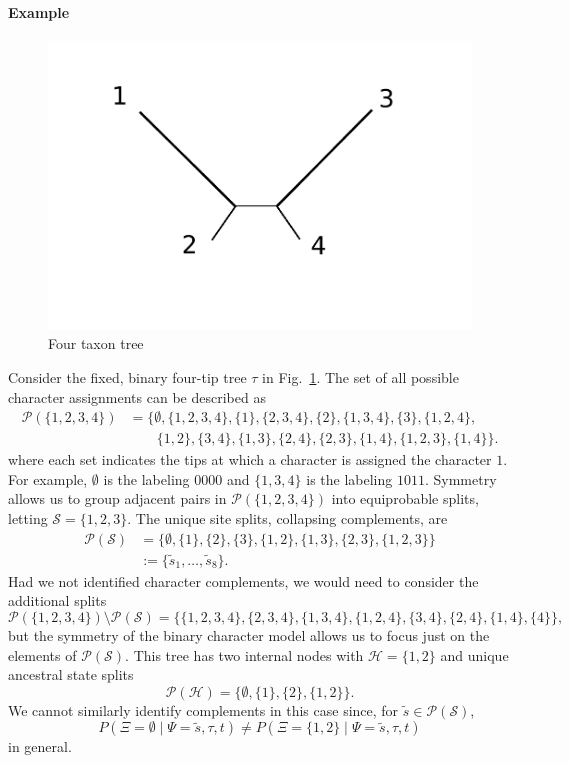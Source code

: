 \documentclass[a4paper]{article}
\newcommand{\siteSplit}{\tilde{s}}
\newcommand{\siteSplitSet}{\mathcal{S}}
\newcommand{\ancestralSplitSet}{\mathcal{H}}
\newcommand{\siteSplitRV}{\Psi}
\newcommand{\ancestralSplitRV}{\Xi}
\begin{document}
\paragraph{Example}
\begin{figure}
    \centering
    \includegraphics[width=.45\textwidth]{unrooted_four_taxa}
    \caption{Four taxon tree}
\label{fig:four-taxa-tree}
\end{figure}

Consider the fixed, binary four-tip tree $\tau$ in Fig.~\ref{fig:four-taxa-tree}.
The set of all possible character assignments can be described as
\begin{align*}
\mathcal{P}(\{1,2,3,4\}) &= \{\emptyset, \{1,2,3,4\}, \{1\}, \{2,3,4\}, \{2\}, \{1,3,4\}, \{3\}, \{1,2,4\}, \\
                         &\qquad \{1,2\}, \{3,4\}, \{1,3\}, \{2,4\}, \{2,3\}, \{1,4\}, \{1,2,3\}, \{1,4\}\}.
\end{align*}
where each set indicates the tips at which a character is assigned the character $1$.
For example, $\emptyset$ is the labeling $0000$ and $\{1,3,4\}$ is the labeling $1011$.
Symmetry allows us to group adjacent pairs in $\mathcal{P}(\{1,2,3,4\})$ into equiprobable splits, letting $\siteSplitSet=\{1,2,3\}$.
The unique site splits, collapsing complements, are
\begin{align*}
    \mathcal{P}(\siteSplitSet) &= \{\emptyset, \{1\}, \{2\}, \{3\}, \{1,2\}, \{1,3\}, \{2,3\}, \{1,2,3\}\} \\
& := \{\siteSplit_1, \ldots, \siteSplit_8\}.
\end{align*}
Had we not identified character complements, we would need to consider the additional splits
$$
\mathcal{P}(\{1,2,3,4\}) \setminus \mathcal{P}(\siteSplitSet) = \{\{1,2,3,4\}, \{2,3,4\}, \{1,3,4\}, \{1,2,4\}, \{3,4\}, \{2,4\}, \{1,4\}, \{4\}\},
$$
but the symmetry of the binary character model allows us to focus just on the elements of $\mathcal{P}(\siteSplitSet)$.
This tree has two internal nodes with $\ancestralSplitSet=\{1,2\}$ and unique ancestral state splits
$$
\mathcal{P}(\ancestralSplitSet) = \{\emptyset, \{1\}, \{2\}, \{1,2\}\}.
$$
We cannot similarly identify complements in this case since, for $\siteSplit\in\mathcal{P}(\siteSplitSet)$,
$$
P(\ancestralSplitRV=\emptyset \mid \siteSplitRV=\siteSplit, \tau, t)\neq P(\ancestralSplitRV=\{1,2\} \mid \siteSplitRV=\siteSplit, \tau, t)
$$
in general.
\end{document}
